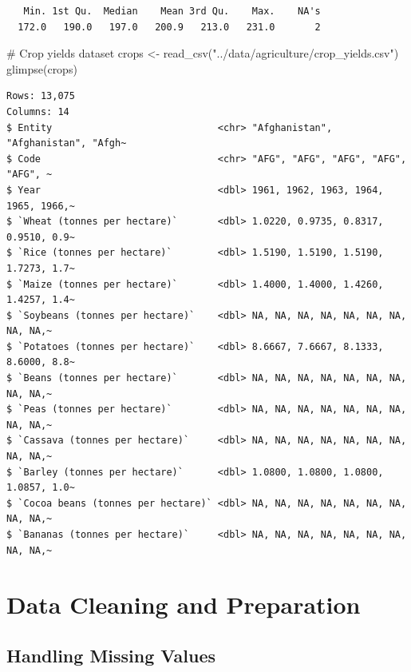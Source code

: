 \documentclass[
  letterpaper,
]{book}
\newenvironment{Shaded}{\begin{snugshade}}{\end{snugshade}}
\newcommand{\CommentTok}[1]{\textcolor[rgb]{0.37,0.37,0.37}{#1}}
\newcommand{\FunctionTok}[1]{\textcolor[rgb]{0.28,0.35,0.67}{#1}}
\newcommand{\NormalTok}[1]{\textcolor[rgb]{0.00,0.23,0.31}{#1}}
\newcommand{\OtherTok}[1]{\textcolor[rgb]{0.00,0.23,0.31}{#1}}
\newcommand{\StringTok}[1]{\textcolor[rgb]{0.13,0.47,0.30}{#1}}
\begin{document}
\begin{verbatim}
   Min. 1st Qu.  Median    Mean 3rd Qu.    Max.    NA's 
  172.0   190.0   197.0   200.9   213.0   231.0       2 
\end{verbatim}

\begin{Shaded}
\begin{Highlighting}[]
\CommentTok{\# Crop yields dataset}
\NormalTok{crops }\OtherTok{\textless{}{-}} \FunctionTok{read\_csv}\NormalTok{(}\StringTok{"../data/agriculture/crop\_yields.csv"}\NormalTok{)}
\FunctionTok{glimpse}\NormalTok{(crops)}
\end{Highlighting}
\end{Shaded}

\begin{verbatim}
Rows: 13,075
Columns: 14
$ Entity                             <chr> "Afghanistan", "Afghanistan", "Afgh~
$ Code                               <chr> "AFG", "AFG", "AFG", "AFG", "AFG", ~
$ Year                               <dbl> 1961, 1962, 1963, 1964, 1965, 1966,~
$ `Wheat (tonnes per hectare)`       <dbl> 1.0220, 0.9735, 0.8317, 0.9510, 0.9~
$ `Rice (tonnes per hectare)`        <dbl> 1.5190, 1.5190, 1.5190, 1.7273, 1.7~
$ `Maize (tonnes per hectare)`       <dbl> 1.4000, 1.4000, 1.4260, 1.4257, 1.4~
$ `Soybeans (tonnes per hectare)`    <dbl> NA, NA, NA, NA, NA, NA, NA, NA, NA,~
$ `Potatoes (tonnes per hectare)`    <dbl> 8.6667, 7.6667, 8.1333, 8.6000, 8.8~
$ `Beans (tonnes per hectare)`       <dbl> NA, NA, NA, NA, NA, NA, NA, NA, NA,~
$ `Peas (tonnes per hectare)`        <dbl> NA, NA, NA, NA, NA, NA, NA, NA, NA,~
$ `Cassava (tonnes per hectare)`     <dbl> NA, NA, NA, NA, NA, NA, NA, NA, NA,~
$ `Barley (tonnes per hectare)`      <dbl> 1.0800, 1.0800, 1.0800, 1.0857, 1.0~
$ `Cocoa beans (tonnes per hectare)` <dbl> NA, NA, NA, NA, NA, NA, NA, NA, NA,~
$ `Bananas (tonnes per hectare)`     <dbl> NA, NA, NA, NA, NA, NA, NA, NA, NA,~
\end{verbatim}

\section{Data Cleaning and
Preparation}\label{data-cleaning-and-preparation}

\subsection{Handling Missing Values}\label{handling-missing-values}
\end{document}
